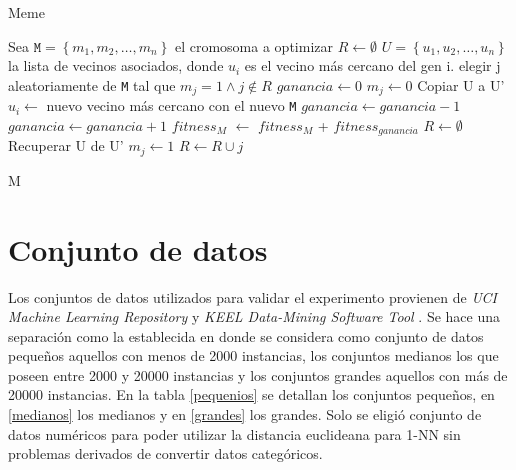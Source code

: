 \begin{algorithm}
\caption{Meme}
\label{meme}
\begin{algorithmic}[1]


\State Sea $\texttt{M} = \left\{ m_1,m_2,\dots,m_n \right\}$ el cromosoma a optimizar 
\State $R \gets \emptyset$
\State $ U = \left\{ u_1,u_2,\dots,u_n \right\}$ la lista de vecinos asociados, donde $u_i$ es el vecino más cercano del gen i. 
	\State elegir j aleatoriamente de \texttt{M} tal que $m_j=1 \land j \notin R$
	\State $ganancia \gets 0$
	\State $m_j \gets 0$
	\State Copiar U a U'
		\State $u_i \gets$ nuevo vecino más cercano con el nuevo \texttt{M}
			\State $ganancia \gets ganancia - 1$
			\State $ganancia \gets ganancia + 1$
		\EndIf
	\EndFor
		\State \emph{$fitness_M$} $\gets$ \emph{$fitness_M$} + \emph{$fitness_{ganancia}$}
		\State $R \gets \emptyset$
	\Else
		\State Recuperar U de U'
		\State $m_j \gets 1$
		\State $ R \gets R \cup j$
	\EndIf
\EndWhile

\State \Return M

\end{algorithmic}
\end{algorithm}


\section{Conjunto de datos}

Los conjuntos de datos utilizados para validar el experimento provienen de \emph{UCI Machine Learning Repository} \cite{Dua:2017} y \emph{KEEL Data-Mining Software Tool} \cite{alcala2011keel}. Se hace una separación como la establecida en \cite{de2004reduccion} donde se considera como conjunto de datos pequeños aquellos con menos de 2000 instancias, los conjuntos medianos los que poseen entre 2000 y 20000 instancias y los conjuntos grandes aquellos con más de 20000 instancias. En la tabla \ref{pequenios} se detallan los conjuntos pequeños, en \ref{medianos} los medianos y en \ref{grandes} los grandes. Solo se eligió conjunto de datos numéricos para poder utilizar la distancia euclideana para 1-NN sin problemas derivados de convertir datos categóricos.

